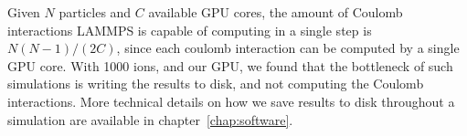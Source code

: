 Given $N$ particles and $C$ available GPU cores, the amount of Coulomb interactions LAMMPS is capable of computing in a single step is $N(N-1)/(2C)$, since each coulomb interaction can be computed by a single GPU core. With 1000 ions, and our GPU, we found that the bottleneck of such simulations is writing the results to disk, and not computing the Coulomb interactions. More technical details on how we save results to disk throughout a simulation are available in chapter~\ref{chap:software}.
